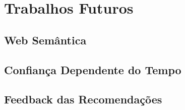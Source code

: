 \chapter{Trabalhos Futuros} %


\label{cha:trabalhos_futuros}




\section{Web Semântica} %


\label{sec:web_semantica}








\section{Confiança Dependente do Tempo} %


\label{sec:confianca_dependente_do_tempo}








\section{Feedback das Recomendações} %


\label{sec:feedback_das_recomendacoes}







